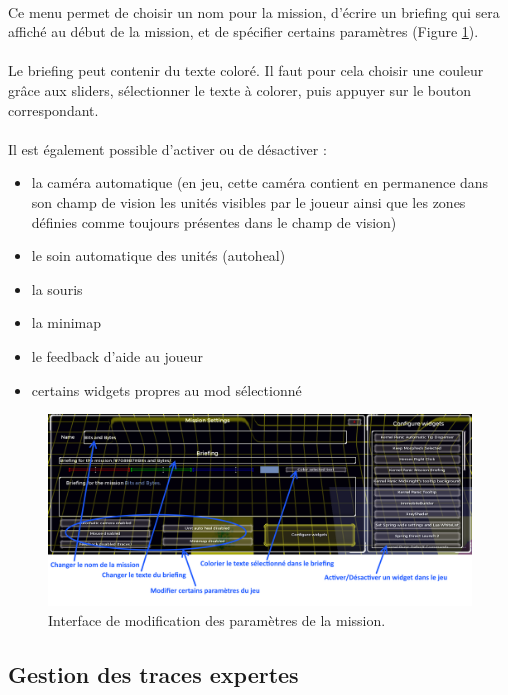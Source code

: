 \documentclass[a4paper]{article}
\begin{document}
\paragraph{ }
Ce menu permet de choisir un nom pour la mission, d'écrire un briefing qui sera affiché au début de la mission, et de spécifier certains paramètres (Figure \ref{fig:editor-mapsettings}).
\paragraph{ }
Le briefing peut contenir du texte coloré. Il faut pour cela choisir une couleur grâce aux sliders, sélectionner le texte à colorer, puis appuyer sur le bouton correspondant.
\paragraph{ }
Il est également possible d'activer ou de désactiver :
\begin{itemize}
\item la caméra automatique (en jeu, cette caméra contient en permanence dans son champ de vision les unités visibles par le joueur ainsi que les zones définies comme toujours présentes dans le champ de vision)
\item le soin automatique des unités (autoheal)
\item la souris
\item la minimap
\item le feedback d'aide au joueur
\item certains widgets propres au mod sélectionné
\end{itemize}
\begin{figure}[H]
\centering
\includegraphics[width=\linewidth]{editor-mapsettings.png}
\caption{Interface de modification des paramètres de la mission.}
\label{fig:editor-mapsettings}
\end{figure}
\subsection{Gestion des traces expertes}
\end{document}
